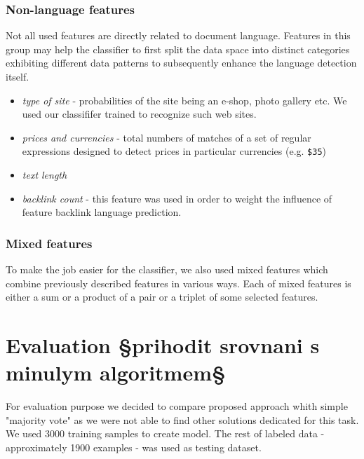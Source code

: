 \documentclass{acm_proc_article-sp}
\begin{document}
{ \subsubsection{Non-language features}
    Not all used features are directly related to document language. Features in this group may help the
    classifier to first split the data space into distinct categories exhibiting different data patterns 
    to subsequently enhance the language detection itself. 

    \begin{itemize}
      \item \textit{type of site} - probabilities of the site being an e-shop, photo gallery etc. We used
      our classififer trained to recognize such web sites.
      \item \textit{prices and currencies} - total numbers of matches of a set of regular
      expressions designed to detect prices in particular currencies (e.g. \texttt{\$35}) 
      \item \textit{text length} 
      \item \textit{backlink count} - this feature was used in order to weight the influence of feature
      backlink language prediction.
    \end{itemize}

  \subsubsection{Mixed features}
    To make the job easier for the classifier, we also used mixed features which combine previously
    described features in various ways. Each of mixed features is either a sum or a product of a
    pair or a triplet of some selected features.


 \section{Evaluation §prihodit srovnani s minulym algoritmem§}
 For evaluation purpose we decided to compare proposed approach whith simple "majority vote" as we were 
 not able to find other solutions dedicated for this task. We used 3000 training samples to create model. 
 The rest of labeled data - approximately 1900 examples - was used as testing dataset. 
 
}
\end{document}
